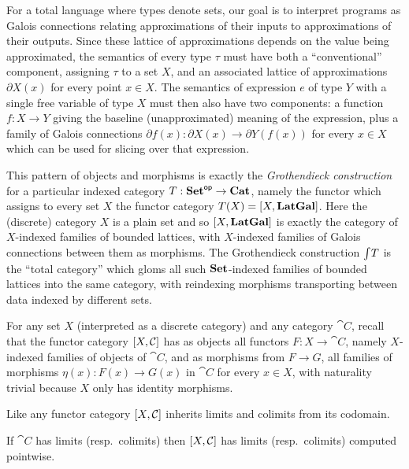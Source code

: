 For a total language where types denote sets, our goal is to interpret programs as Galois connections relating
approximations of their inputs to approximations of their outputs. Since these lattice of approximations
depends on the value being approximated, the semantics of every type $\tau$ must have both a ``conventional''
component, assigning $\tau$ to a set $X$, and an associated lattice of approximations $\partial X(x)$ for
every point $x \in X$. The semantics of expression $e$ of type $Y$ with a single free variable of type $X$
must then also have two components: a function $f: X \to Y$ giving the baseline (unapproximated) meaning of
the expression, plus a family of Galois connections $\partial f(x): \partial X(x) \to \partial Y(f(x))$ for
every $x \in X$ which can be used for slicing over that expression.

This pattern of objects and morphisms is exactly the \emph{Grothendieck construction} for a particular indexed
category $T: \mathbf{Set}^{\mathsf{op}} \to \mathbf{Cat}$, namely the functor which assigns to every set $X$ the functor category $T(X)
= [X,\mathbf{LatGal}]$. Here the (discrete) category $X$ is a plain set and so $[X,\mathbf{LatGal}]$ is exactly
the category of $X$-indexed families of bounded lattices, with $X$-indexed families of Galois connections
between them as morphisms. The Grothendieck construction $\int_{}T$ is the ``total category'' which
gloms all such $\mathbf{Set}$-indexed families of bounded lattices into the same category, with reindexing morphisms
transporting between data indexed by different sets.

\begin{definition}
\label{def:fam:Fam}
For any set $X$ (interpreted as a discrete category) and any category $\cat{C}$, recall that the functor
category $[X,\mathcal{C}]$ has as objects all functors $F: X \to \cat{C}$, namely $X$-indexed families of
objects of $\cat{C}$, and as morphisms from $F \to G$, all families of morphisms $\eta(x): F(x) \to G(x)$ in
$\cat{C}$ for every $x \in X$, with naturality trivial because $X$ only has identity morphisms.
\end{definition}

Like any functor category $[X,\mathcal{C}]$ inherits limits and colimits from its codomain.

\begin{proposition}
If $\cat{C}$ has limits (resp.~colimits) then $[X,\mathcal{C}]$ has limits (resp.~colimits) computed
pointwise.
\end{proposition}

